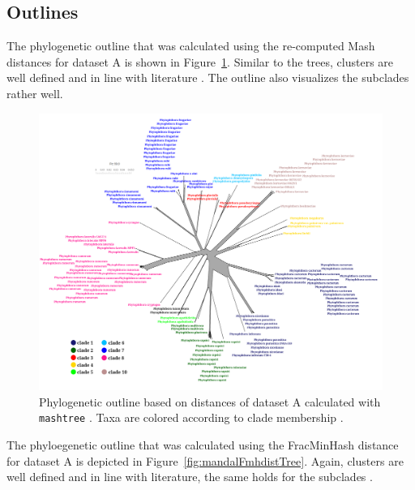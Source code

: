 
\subsection*{Outlines}
The phylogenetic outline that was calculated using the re-computed Mash
distances for dataset A is shown in Figure~\ref{fig:mandalMashOutline}. Similar
to the trees, clusters are well defined and in line with literature
\cite{abadPhytophthoraTaxonomicPhylogenetic2023a,yangExpandedPhylogenyGenus2017}.
The outline also visualizes the subclades rather well.

\begin{figure}
  \centering
  \includegraphics[width=1.0\textwidth]{figures/mashtree_mandal_outline_k21_s2000.png}
  \caption{Phylogenetic outline based on distances of dataset A calculated with
  \texttt{mashtree}
  \cite{ondovMashFastGenome2016,katzMashtreeRapidComparison2019}. Taxa are
  colored according to clade membership
  \cite{abadPhytophthoraTaxonomicPhylogenetic2023a}.}
  \label{fig:mandalMashOutline}
\end{figure}

The phyloegenetic outline that was calculated using the FracMinHash distance for
dataset A is depicted in Figure~\ref{fig:mandalFmhdistTree}. Again, clusters are
well defined and in line with literature, the same holds for the subclades
\cite{abadPhytophthoraTaxonomicPhylogenetic2023a,yangExpandedPhylogenyGenus2017}.

